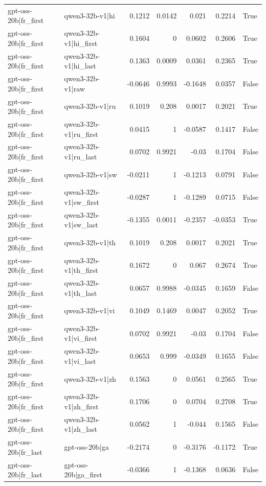 \begin{table}
\begin{tabular}{l l r r r r l}
gpt-oss-20b|fr_first & qwen3-32b-v1|hi & 0.1212 & 0.0142 & 0.021 & 0.2214 & True \\
gpt-oss-20b|fr_first & qwen3-32b-v1|hi_first & 0.1604 & 0 & 0.0602 & 0.2606 & True \\
gpt-oss-20b|fr_first & qwen3-32b-v1|hi_last & 0.1363 & 0.0009 & 0.0361 & 0.2365 & True \\
gpt-oss-20b|fr_first & qwen3-32b-v1|raw & -0.0646 & 0.9993 & -0.1648 & 0.0357 & False \\
gpt-oss-20b|fr_first & qwen3-32b-v1|ru & 0.1019 & 0.208 & 0.0017 & 0.2021 & True \\
gpt-oss-20b|fr_first & qwen3-32b-v1|ru_first & 0.0415 & 1 & -0.0587 & 0.1417 & False \\
gpt-oss-20b|fr_first & qwen3-32b-v1|ru_last & 0.0702 & 0.9921 & -0.03 & 0.1704 & False \\
gpt-oss-20b|fr_first & qwen3-32b-v1|sw & -0.0211 & 1 & -0.1213 & 0.0791 & False \\
gpt-oss-20b|fr_first & qwen3-32b-v1|sw_first & -0.0287 & 1 & -0.1289 & 0.0715 & False \\
gpt-oss-20b|fr_first & qwen3-32b-v1|sw_last & -0.1355 & 0.0011 & -0.2357 & -0.0353 & True \\
gpt-oss-20b|fr_first & qwen3-32b-v1|th & 0.1019 & 0.208 & 0.0017 & 0.2021 & True \\
gpt-oss-20b|fr_first & qwen3-32b-v1|th_first & 0.1672 & 0 & 0.067 & 0.2674 & True \\
gpt-oss-20b|fr_first & qwen3-32b-v1|th_last & 0.0657 & 0.9988 & -0.0345 & 0.1659 & False \\
gpt-oss-20b|fr_first & qwen3-32b-v1|vi & 0.1049 & 0.1469 & 0.0047 & 0.2052 & True \\
gpt-oss-20b|fr_first & qwen3-32b-v1|vi_first & 0.0702 & 0.9921 & -0.03 & 0.1704 & False \\
gpt-oss-20b|fr_first & qwen3-32b-v1|vi_last & 0.0653 & 0.999 & -0.0349 & 0.1655 & False \\
gpt-oss-20b|fr_first & qwen3-32b-v1|zh & 0.1563 & 0 & 0.0561 & 0.2565 & True \\
gpt-oss-20b|fr_first & qwen3-32b-v1|zh_first & 0.1706 & 0 & 0.0704 & 0.2708 & True \\
gpt-oss-20b|fr_first & qwen3-32b-v1|zh_last & 0.0562 & 1 & -0.044 & 0.1565 & False \\
gpt-oss-20b|fr_last & gpt-oss-20b|ga & -0.2174 & 0 & -0.3176 & -0.1172 & True \\
gpt-oss-20b|fr_last & gpt-oss-20b|ga_first & -0.0366 & 1 & -0.1368 & 0.0636 & False \\

\end{tabular}
\end{table}
